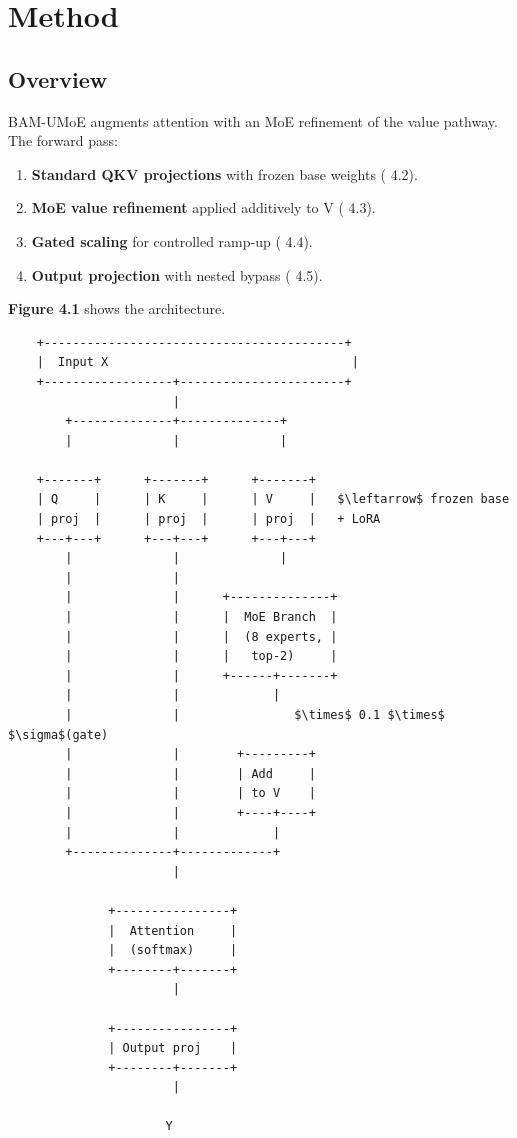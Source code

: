 \section{Method}

\subsection{Overview}

BAM-UMoE augments attention with an MoE refinement of the value pathway. 
The forward pass:

\begin{enumerate}
\item \textbf{Standard QKV projections} with frozen base weights ( 4.2).
\item \textbf{MoE value refinement} applied additively to V ( 4.3).
\item \textbf{Gated scaling} for controlled ramp-up ( 4.4).
\item \textbf{Output projection} with nested bypass ( 4.5).

\end{enumerate}
\textbf{Figure 4.1} shows the architecture.

\begin{lstlisting}
    +------------------------------------------+
    |  Input X                                  |
    +------------------+-----------------------+
                       |
        +--------------+--------------+
        |              |              |
                                       
    +-------+      +-------+      +-------+
    | Q     |      | K     |      | V     |   $\leftarrow$ frozen base
    | proj  |      | proj  |      | proj  |   + LoRA
    +---+---+      +---+---+      +---+---+
        |              |              |
        |              |               
        |              |      +--------------+
        |              |      |  MoE Branch  |
        |              |      |  (8 experts, |
        |              |      |   top-2)     |
        |              |      +------+-------+
        |              |             |
        |              |                $\times$ 0.1 $\times$ $\sigma$(gate)
        |              |        +---------+
        |              |        | Add     |
        |              |        | to V    |
        |              |        +----+----+
        |              |             |
        +--------------+-------------+
                       |
                        
              +----------------+
              |  Attention     |
              |  (softmax)     |
              +--------+-------+
                       |
                        
              +----------------+
              | Output proj    |
              +--------+-------+
                       |
                        
                      Y
\end{lstlisting}


